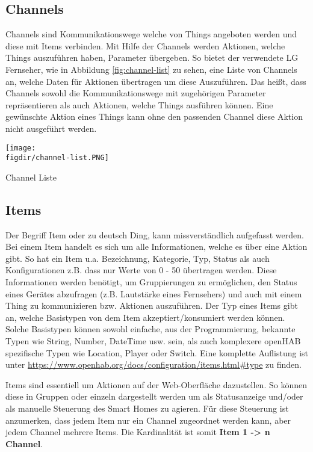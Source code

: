 \subsection{Channels} \label{sec:channels}
Channels sind Kommunikationswege welche von Things angeboten werden und diese mit Items verbinden. Mit Hilfe der Channels werden Aktionen, welche Things auszuführen haben, Parameter übergeben. So bietet der verwendete LG Fernseher, wie in Abbildung \ref{fig:channel-list} zu sehen, eine Liste von Channels an, welche Daten für Aktionen übertragen um diese Auszuführen. Das heißt, dass Channels sowohl die Kommunikationswege mit zugehörigen Parameter repräsentieren als auch Aktionen, welche Things ausführen können. Eine gewünschte Aktion eines Things kann ohne den passenden Channel diese Aktion nicht ausgeführt werden.

{
	\centering
	\captionsetup{type=figure}
	\texttt{[image: \\figdir/channel-list.PNG]}
	\caption{Channel Liste\label{fig:channel-list}}
}

\subsection{Items}
Der Begriff Item oder zu deutsch Ding, kann missverständlich aufgefasst werden. Bei einem Item handelt es sich um alle Informationen, welche es über eine Aktion gibt. So hat ein Item u.a. Bezeichnung, Kategorie, Typ, Status als auch Konfigurationen z.B. dass nur Werte von 0 - 50 übertragen werden. Diese Informationen werden benötigt, um Gruppierungen zu ermöglichen, den Status eines Gerätes abzufragen (z.B. Lautstärke eines Fernsehers) und auch mit einem Thing zu kommunizieren bzw. Aktionen auszuführen. Der Typ eines Items gibt an, welche Basistypen von dem Item akzeptiert/konsumiert werden können. Solche Basistypen können sowohl einfache, aus der Programmierung, bekannte Typen wie String, Number, DateTime usw. sein, als auch komplexere openHAB spezifische Typen wie Location, Player oder Switch. Eine komplette Auflistung ist unter \url{https://www.openhab.org/docs/configuration/items.html#type} zu finden.

Items sind essentiell um Aktionen auf der Web-Oberfläche dazustellen. So können diese in Gruppen oder einzeln dargestellt werden um als Statusanzeige und/oder als manuelle Steuerung des Smart Homes zu agieren. Für diese Steuerung ist anzumerken, dass jedem Item nur ein Channel zugeordnet werden kann, aber jedem Channel mehrere Items. Die Kardinalität ist somit \textbf{Item 1 -> n Channel}.

